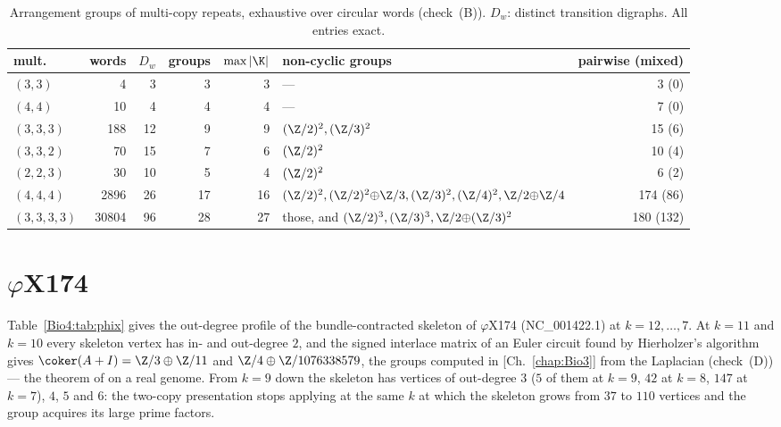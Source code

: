 \begin{table}[ht]
\centering\footnotesize
\begin{tabular}{lrrrrlr}
\toprule
mult. & words & $D_w$ & groups & $\max|\K|$ & non-cyclic groups & pairwise (mixed)\\
\midrule
$(3,3)$       &     4 &  3 &  3 &  3 & --- & 3 (0)\\
$(4,4)$       &    10 &  4 &  4 &  4 & --- & 7 (0)\\
$(3,3,3)$     &   188 & 12 &  9 &  9 & $(\Z/2)^{2},(\Z/3)^{2}$ & 15 (6)\\
$(3,3,2)$     &    70 & 15 &  7 &  6 & $(\Z/2)^{2}$ & 10 (4)\\
$(2,2,3)$     &    30 & 10 &  5 &  4 & $(\Z/2)^{2}$ & 6 (2)\\
$(4,4,4)$     &  2896 & 26 & 17 & 16 & $(\Z/2)^{2},(\Z/2)^{2}{\oplus}\Z/3,(\Z/3)^{2},(\Z/4)^{2},\Z/2{\oplus}\Z/4$ & 174 (86)\\
$(3,3,3,3)$   & 30804 & 96 & 28 & 27 & those, and $(\Z/2)^{3},(\Z/3)^{3},\Z/2{\oplus}(\Z/3)^{2}$ & 180 (132)\\
\bottomrule
\end{tabular}
\caption{Arrangement groups of multi-copy repeats, exhaustive over circular words
(check~(B)). $D_w$: distinct transition digraphs. All entries exact.}
\label{Bio4:tab:census}
\end{table}

\section{$\varphi$X174}\label{Bio4:sec:phix}

Table~\ref{Bio4:tab:phix} gives the out-degree profile of the bundle-contracted skeleton of
$\varphi$X174 (NC\_001422.1) at $k=12,\dots,7$. At $k=11$ and $k=10$ every skeleton
vertex has in- and out-degree $2$, and the signed interlace matrix of an Euler circuit
found by Hierholzer's algorithm gives $\coker(A+I)=\Z/3\oplus\Z/11$ and
$\Z/4\oplus\Z/1076338579$, the groups computed in [Ch.~\ref{chap:Bio3}] from the Laplacian
(check~(D)) --- the theorem of \cite{MMN} on a real genome. From $k=9$ down the skeleton
has vertices of out-degree $3$ ($5$ of them at $k=9$, $42$ at $k=8$, $147$ at $k=7$),
$4$, $5$ and $6$: the two-copy presentation stops applying at the same $k$ at which the
skeleton grows from $37$ to $110$ vertices and the group acquires its large prime factors.

